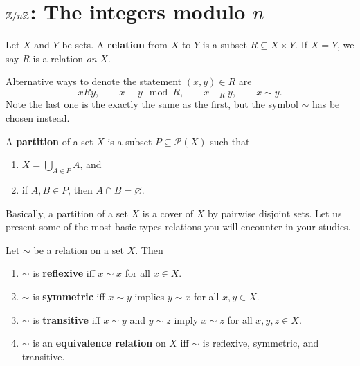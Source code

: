 \documentclass[11pt,a4paper]{article}
\begin{document}
\def\contador{Lesson 2}


\section[]{\(\mathbb{Z}/ n\mathbb{Z}\): The integers modulo \(n\)}

\begin{defi}
    Let $X$ and $Y$ be sets.
    A \textbf{relation} from \(X\) to \(Y\) is a subset $R \subseteq X {\times} Y$.
    If \(X= Y\), we say \(R\) is a relation \textit{on} \(X\).
\end{defi}

Alternative ways to denote the statement \((x,y)\in R\) are 
\[x R y,\qquad x\equiv y\! \mod R,\qquad x\equiv_R y,\qquad x\sim y .\]
Note the  last one is the exactly the same as the first, but the symbol \(\sim\) has be chosen instead. 





\begin{defi}
    A \textbf{partition} of a set \(X\) is a subset \(P\subseteq \mathcal{P}(X)\) such that 
    \begin{enumerate}[label=(\roman*)]
        \item \(X = \bigcup_{A\in P} A\), and 
        \item if \(A,B\in P\), then \(A\cap B = \varnothing\).
    \end{enumerate}
\end{defi}

Basically, a partition of a set \(X\) is a cover of \(X\) by pairwise disjoint sets.
Let us present some of the most basic types  relations you will encounter in your studies.

\begin{defi}
    Let \(\sim\) be a relation on a set \(X\).
    Then 
    \begin{enumerate}[label=(\roman*)]
        \item \(\sim\) is \textbf{reflexive} iff \(x\sim x\) for all \(x\in X\).
        \item \(\sim\) is \textbf{symmetric} iff \(x\sim y\) implies \(y\sim x\) for all \(x,y\in X\).
        \item \(\sim\) is \textbf{transitive} iff \(x\sim y\) and \(y\sim z\) imply \(x\sim z\) for all \(x,y,z\in X\).
        \item \(\sim\) is an  \textbf{equivalence relation} on \(X\) iff \(\sim\) is reflexive, symmetric, and transitive.
    \end{enumerate}
\end{defi}
\end{document}
